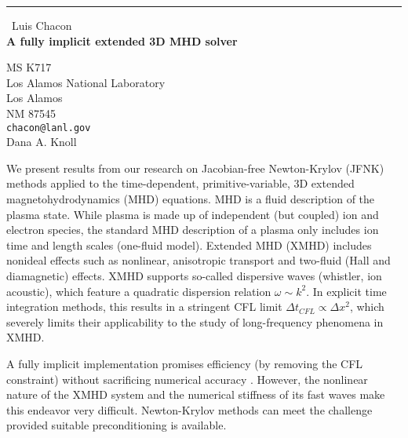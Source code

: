 \documentclass{report}
\begin{document}
\begin{center}
\rule{6in}{1pt} \
{\large Luis Chacon \\
{\bf A fully implicit extended 3D MHD solver}}

MS K717 \\ Los Alamos National Laboratory \\ Los Alamos \\ NM 87545
\\
{\tt chacon@lanl.gov}\\
Dana A. Knoll\end{center}

We present results from our research on Jacobian-free Newton-Krylov
(JFNK) methods applied to the time-dependent, primitive-variable,
3D extended magnetohydrodynamics (MHD) equations. MHD is a fluid description
of the plasma state. While plasma is made up of independent (but coupled)
ion and electron species, the standard MHD description of a plasma
only includes ion time and length scales (one-fluid model). Extended
MHD (XMHD) includes nonideal effects such as nonlinear, anisotropic
transport and two-fluid (Hall and diamagnetic) effects. XMHD supports
so-called dispersive waves (whistler, ion acoustic), which feature
a quadratic dispersion relation $\omega \sim k^{2}$. In explicit
time integration methods, this results in a stringent CFL limit $\Delta
t_{CFL}\propto \Delta x^{2}$,
which severely limits their applicability to the study of long-frequency
phenomena in XMHD.

A fully implicit implementation promises efficiency (by removing the
CFL constraint) without sacrificing numerical accuracy \cite{knoll-jcp-03}.
However, the nonlinear nature of the XMHD system and the numerical
stiffness of its fast waves make this endeavor very difficult. Newton-Krylov
methods can meet the challenge provided suitable preconditioning is
available.
\end{document}
